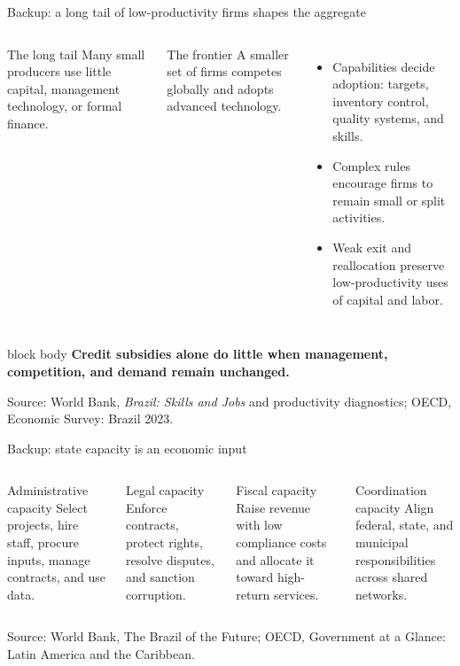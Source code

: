 \documentclass[10pt,aspectratio=169]{beamer}
\newcommand{\source}[1]{%
  \par\vfill{\tiny\color{MidGray}Source: #1}}
\newcommand{\question}[1]{%
  \begin{beamercolorbox}[rounded=true,sep=0.55em,wd=\textwidth]{block body}
    \centering\large\textbf{#1}
  \end{beamercolorbox}}
\begin{document}
\begin{frame}{Backup: a long tail of low-productivity firms shapes the aggregate}
  \begin{columns}[T,onlytextwidth]
      \begin{block}{The long tail}
        Many small producers use little capital, management technology, or formal finance.
      \end{block}
      \vspace{.3cm}
      \begin{exampleblock}{The frontier}
        A smaller set of firms competes globally and adopts advanced technology.
      \end{exampleblock}
      \begin{itemize}
        \item Capabilities decide adoption: targets, inventory control, quality systems, and skills.
        \item Complex rules encourage firms to remain small or split activities.
        \item Weak exit and reallocation preserve low-productivity uses of capital and labor.
      \end{itemize}
  \end{columns}
  \vspace{.45cm}
  \question{Credit subsidies alone do little when management, competition, and demand remain unchanged.}
  \source{World Bank, \emph{Brazil: Skills and Jobs} and productivity diagnostics; OECD, Economic Survey: Brazil 2023.}
\end{frame}

\begin{frame}{Backup: state capacity is an economic input}
  \begin{columns}[T,onlytextwidth]
      \begin{block}{Administrative capacity}
        Select projects, hire staff, procure inputs, manage contracts, and use data.
      \end{block}
      \vspace{.25cm}
      \begin{block}{Legal capacity}
        Enforce contracts, protect rights, resolve disputes, and sanction corruption.
      \end{block}
      \begin{exampleblock}{Fiscal capacity}
        Raise revenue with low compliance costs and allocate it toward high-return services.
      \end{exampleblock}
      \vspace{.25cm}
      \begin{exampleblock}{Coordination capacity}
        Align federal, state, and municipal responsibilities across shared networks.
      \end{exampleblock}
  \end{columns}
  \source{World Bank, The Brazil of the Future; OECD, Government at a Glance: Latin America and the Caribbean.}
\end{frame}
\end{document}
